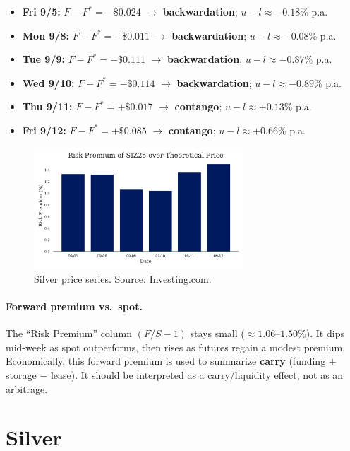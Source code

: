 \documentclass[10pt,a4paper]{article} %
\let\oldsection\section
\renewcommand{\section}{%
      \clearpage
      \thispagestyle{myfancy}%
      \oldsection
    }
\begin{document}
\begin{itemize}
  \item \textbf{Fri 9/5:} $F-F^{*} = -\$0.024$ $\rightarrow$ \textbf{backwardation}; $u-l \approx -0.18\%$ p.a.
  \item \textbf{Mon 9/8:} $F-F^{*} = -\$0.011$ $\rightarrow$ \textbf{backwardation}; $u-l \approx -0.08\%$ p.a.
  \item \textbf{Tue 9/9:} $F-F^{*} = -\$0.111$ $\rightarrow$ \textbf{backwardation}; $u-l \approx -0.87\%$ p.a.
  \item \textbf{Wed 9/10:} $F-F^{*} = -\$0.114$ $\rightarrow$ \textbf{backwardation}; $u-l \approx -0.89\%$ p.a.
  \item \textbf{Thu 9/11:} $F-F^{*} = +\$0.017$ $\rightarrow$ \textbf{contango}; $u-l \approx +0.13\%$ p.a.
  \item \textbf{Fri 9/12:} $F-F^{*} = +\$0.085$ $\rightarrow$ \textbf{contango}; $u-l \approx +0.66\%$ p.a.
\end{itemize}

\begin{figure}[h]
\centering
\includegraphics[width=0.7\textwidth]{figures/silver_risk_premium.pdf}
\caption{Silver price series. Source: Investing.com.}
\end{figure}

\paragraph{Forward premium vs.\ spot.}
The ``Risk Premium'' column $(F/S-1)$ stays small ($\approx 1.06$--$1.50\%$). It dips mid-week as spot outperforms, then rises as futures regain a modest premium. Economically, this forward premium is used to summarize \textbf{carry} (funding $+$ storage $-$ lease). It should be interpreted as a carry/liquidity effect, not as an arbitrage.


\section{Silver}
\end{document}
